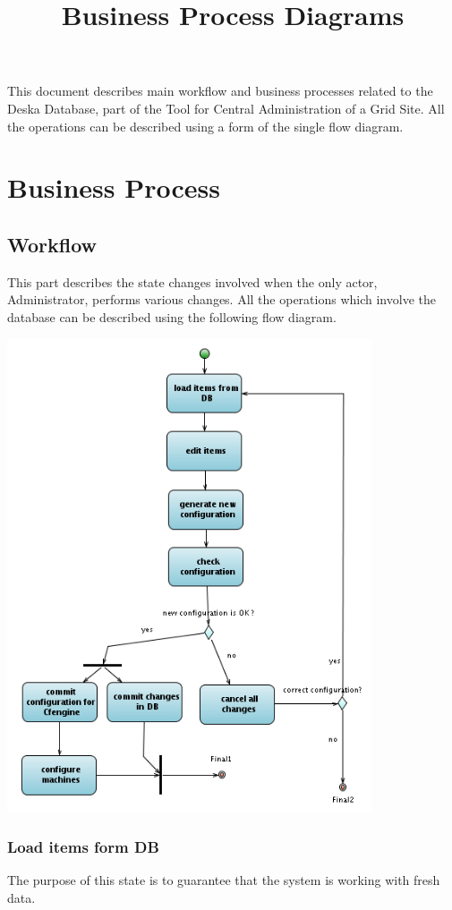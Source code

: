 \documentclass{article}
\begin{document}
\title{Business Process Diagrams}

This document describes main workflow and business processes related to the
Deska Database, part of the Tool for Central Administration of a Grid Site.
All the operations can be described using a form of the single flow diagram.


\section{Business Process}

\subsection{Workflow}
This part describes the state changes involved when the only actor,
Administrator, performs various changes.  All the operations which involve the
database can be described using the following flow diagram.

\includegraphics[height=14cm]{business_process.png}

\subsubsection{Load items form DB}
The purpose of this state is to guarantee that the system is working with fresh
data.
\end{document}
